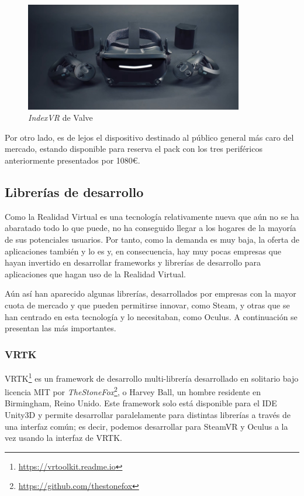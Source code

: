 \begin{figure}[!h]
\begin{center}
    \includegraphics[width=0.85\textwidth]{imagenes/2/indexvr.jpg}
    \caption{\textit{IndexVR} de Valve}
    \label{fig:index-vr}
\end{center}
\end{figure}

Por otro lado, es de lejos el dispositivo destinado al público general más caro del mercado, estando disponible para reserva el pack con los tres periféricos anteriormente presentados por 1080\euro.

\subsection{Librerías de desarrollo}

Como la Realidad Virtual es una tecnología relativamente nueva que aún no se ha abaratado todo lo que puede, no ha conseguido llegar a los hogares de la mayoría de sus potenciales usuarios. Por tanto, como la demanda es muy baja, la oferta de aplicaciones también y lo es y, en consecuencia, hay muy pocas empresas que hayan invertido en desarrollar frameworks y librerías de desarrollo para aplicaciones que hagan uso de la Realidad Virtual.

Aún así han aparecido algunas librerías, desarrollados por empresas con la mayor cuota de mercado y que pueden permitirse innovar, como Steam, y otras que se han centrado en esta tecnología y lo necesitaban, como Oculus. A continuación se presentan las más importantes.

\subsubsection{VRTK}

\acl{VRTK}\footnote{\url{https://vrtoolkit.readme.io}} es un framework de desarrollo multi-librería desarrollado en solitario bajo licencia \acs{MIT} por \textit{TheStoneFox}\footnote{\url{https://github.com/thestonefox}}, o Harvey Ball, un hombre residente en Birmingham, Reino Unido. Este framework solo está disponible para el \acs{IDE} Unity3D y permite desarrollar paralelamente para distintas librerías a través de una interfaz común; es decir, podemos desarrollar para SteamVR y Oculus a la vez usando la interfaz de \acs{VRTK}.

